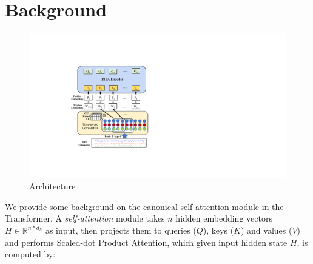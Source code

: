 \section{Background}
\label{sec.preliminary}
\begin{sloppypar}


\begin{figure}[t]
 \vspace{-3mm}
     \centering
     \includegraphics[width=0.8\columnwidth]{figures/model_arch.pdf}
     \vspace{-2mm}
     \caption{\system Architecture}
     \label{fig.convolution}
     \vspace{-4mm}
\end{figure}



We provide some background on the canonical self-attention module in the Transformer\cite{DBLP:conf/nips/VaswaniSPUJGKP17}.
A \emph{self-attention} module takes $n$ hidden embedding vectors $H \in \mathbb{R}^{n*d_h}$ as input, then projects them to queries ($Q$), keys ($K$) and values ($V$) and performs Scaled-dot Product Attention, which given input hidden state $H$, is computed by:


\end{sloppypar}
